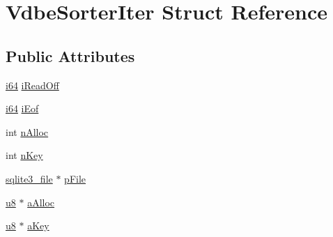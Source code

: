 \hypertarget{struct_vdbe_sorter_iter}{\section{Vdbe\-Sorter\-Iter Struct Reference}
\label{struct_vdbe_sorter_iter}
}
\subsection*{Public Attributes}
\begin{DoxyCompactItemize}
\item 
\hyperlink{sqlite3_8c_a2a0f0f4ae7001eb54351f77ea1cdbcfd}{i64} \hyperlink{struct_vdbe_sorter_iter_a3a02adf412dd2af1022d3d5f95aee180}{i\-Read\-Off}
\item 
\hyperlink{sqlite3_8c_a2a0f0f4ae7001eb54351f77ea1cdbcfd}{i64} \hyperlink{struct_vdbe_sorter_iter_a017704dcc972c2d246414290e0a7ac81}{i\-Eof}
\item 
int \hyperlink{struct_vdbe_sorter_iter_a1e2eeb598b3709bca999e96e42163783}{n\-Alloc}
\item 
int \hyperlink{struct_vdbe_sorter_iter_a6c73b1e17f13a83fa99c21ab5fc4cf2b}{n\-Key}
\item 
\hyperlink{structsqlite3__file}{sqlite3\-\_\-file} $\ast$ \hyperlink{struct_vdbe_sorter_iter_ac6487cb536e6a3ba6209a5446b4ce0b0}{p\-File}
\item 
\hyperlink{sqlite3_8c_a74a0f6424ae628af25f23f0a35f6ead3}{u8} $\ast$ \hyperlink{struct_vdbe_sorter_iter_a093de2f50db1cb5f84c6b9194dcc981b}{a\-Alloc}
\item 
\hyperlink{sqlite3_8c_a74a0f6424ae628af25f23f0a35f6ead3}{u8} $\ast$ \hyperlink{struct_vdbe_sorter_iter_ae3f5248ba23036136e11d3c6d067f485}{a\-Key}
\end{DoxyCompactItemize}


